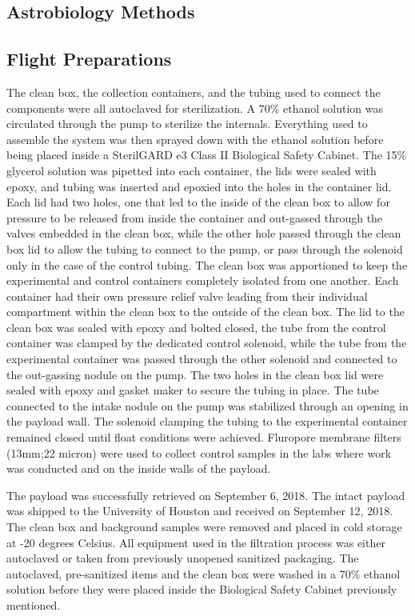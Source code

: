 \subsection{Astrobiology Methods}
\label{sec:Astrobiology Methods}
\subsection{ Flight Preparations }
 The clean box, the collection containers, and the tubing used to connect the components were all autoclaved for sterilization. A 70\% ethanol solution was circulated through the pump to sterilize the internals. Everything used to assemble the system was then sprayed down with the ethanol solution before being placed inside a SterilGARD e3 Class II Biological Safety Cabinet. The 15\% glycerol solution was pipetted into each container, the lids were sealed with epoxy, and tubing was inserted and epoxied into the holes in the container lid. Each lid had two holes, one that led to the inside of the clean box to allow for pressure to be released from inside the container and out-gassed through the valves embedded in the clean box, while the other hole passed through the clean box lid to allow the tubing to connect to the pump, or pass through the solenoid only in the case of the control tubing. The clean box was apportioned to keep the experimental and control containers completely isolated from one another. Each container had their own pressure relief valve leading from their individual compartment within the clean box to the outside of the clean box. The lid to the clean box was sealed with epoxy and bolted closed, the tube from the control container was clamped by the dedicated control solenoid, while the tube from the experimental container was passed through the other solenoid and connected to the out-gassing nodule on the pump. The two holes in the clean box lid were sealed with epoxy and gasket maker to secure the tubing in place. The tube connected to the intake nodule on the pump was stabilized through an opening in the payload wall. The solenoid clamping the tubing to the experimental container remained closed until float conditions were achieved. Fluropore membrane filters (13mm;22 micron) were used to collect control samples in the labs where work was conducted and on the inside walls of the payload. 
 
 The payload was successfully retrieved on September 6, 2018. The intact payload was shipped to the University of Houston and received on September 12, 2018. The clean box and background samples were removed and placed in cold storage at -20 degrees Celsius. All equipment used in the filtration process was either autoclaved or taken from previously unopened sanitized packaging. The autoclaved, pre-sanitized items and the clean box were washed in a 70\% ethanol solution before they were placed inside the Biological Safety Cabinet previously mentioned. 
 
